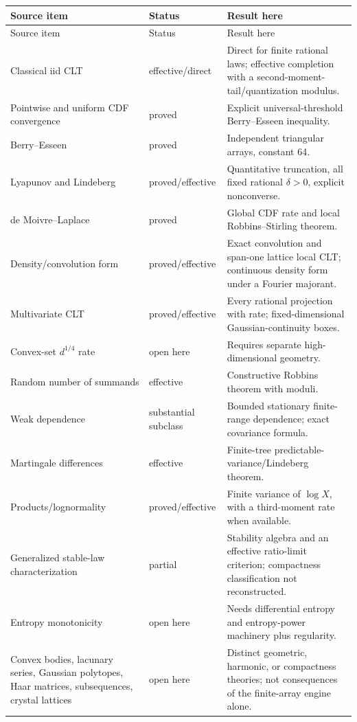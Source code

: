 \documentclass[11pt]{article}
\begin{document}
\begin{center}
\small
\begin{longtable}{p{}p{}p{}}
\toprule
Source item & Status & Result here \\
\midrule
\endfirsthead
\toprule
Source item & Status & Result here \\
\midrule
\endhead
Classical iid CLT & effective/direct & Direct for finite rational laws; effective completion with a second-moment-tail/quantization modulus. \\
Pointwise and uniform CDF convergence & proved & Explicit universal-threshold Berry--Esseen inequality. \\
Berry--Esseen & proved & Independent triangular arrays, constant 64. \\
Lyapunov and Lindeberg & proved/effective & Quantitative truncation, all fixed rational \(\delta>0\), explicit nonconverse. \\
de Moivre--Laplace & proved & Global CDF rate and local Robbins--Stirling theorem. \\
Density/convolution form & proved/effective & Exact convolution and span-one lattice local CLT; continuous density form under a Fourier majorant. \\
Multivariate CLT & proved/effective & Every rational projection with rate; fixed-dimensional Gaussian-continuity boxes. \\
Convex-set \(d^{1/4}\) rate & open here & Requires separate high-dimensional geometry. \\
Random number of summands & effective & Constructive Robbins theorem with moduli. \\
Weak dependence & substantial subclass & Bounded stationary finite-range dependence; exact covariance formula. \\
Martingale differences & effective & Finite-tree predictable-variance/Lindeberg theorem. \\
Products/lognormality & proved/effective & Finite variance of \(\log X\), with a third-moment rate when available. \\
Generalized stable-law characterization & partial & Stability algebra and an effective ratio-limit criterion; compactness classification not reconstructed. \\
Entropy monotonicity & open here & Needs differential entropy and entropy-power machinery plus regularity. \\
Convex bodies, lacunary series, Gaussian polytopes, Haar matrices, subsequences, crystal lattices & open here & Distinct geometric, harmonic, or compactness theories; not consequences of the finite-array engine alone. \\
\bottomrule
\end{longtable}
\end{center}
\end{document}
